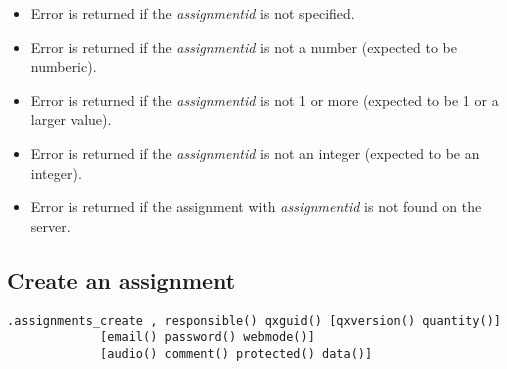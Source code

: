 \errheader
\begin{itemize}
    \item Error  is returned if the \textit{assignmentid} is not specified.
    \item Error  is returned if the \textit{assignmentid} is not a number (expected to be numberic).
    \item Error  is returned if the \textit{assignmentid} is not 1 or more (expected to be 1 or a larger value).
    \item Error  is returned if the \textit{assignmentid} is not an integer (expected to be an integer).    
    \item Error  is returned if the assignment with \textit{assignmentid} is not found on the server.
\end{itemize}


\subsection{Create an assignment}

\begin{lstlisting}[style=CommandLineStyle]
.assignments_create , responsible() qxguid() [qxversion() quantity()]
             [email() password() webmode()]
             [audio() comment() protected() data()]
\end{lstlisting}

